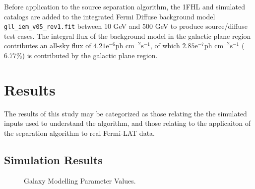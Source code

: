 \documentclass{PoS}
\begin{document}
\begin{table}
\centering
{}
\caption{Galactic plane fluxes for source population catalogs.}
\end{table}

Before application to the source separation algorithm, the 1FHL and simulated catalogs are added to the integrated Fermi Diffuse background model \verb|gll_iem_v05_rev1.fit| between 10 GeV and 500 GeV to produce source/diffuse test cases. The integral flux of the background model in the galactic plane region contributes an all-sky flux of $4.21\text{e}^{-6} \text{ph cm}^{-2}\text{s}^{-1}$, of which $2.85\text{e}^{-7} \text{ph cm}^{-2}\text{s}^{-1}$ ($6.77\%$) is contributed by the galactic plane region.


\section{Results}

The results of this study may be categorized as those relating the the simulated inputs used to understand the algorithm, and those relating to the applicaiton of the separation algorithm to real Fermi-LAT data.

\subsection{Simulation Results}

\begin{figure}
\centering
{}
\caption{Galaxy Modelling Parameter Values.}
\end{figure}
\end{document}
